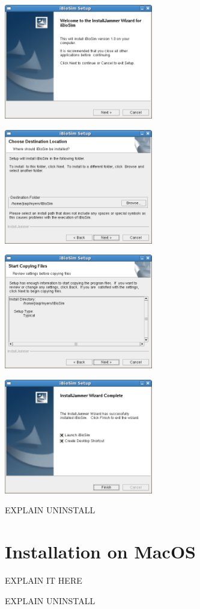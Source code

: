 \documentclass[titlepage,11pt]{article}
\begin{document}
\includegraphics[height=50mm]{screenshots/setup}

\includegraphics[height=50mm]{screenshots/location}

\includegraphics[height=50mm]{screenshots/confirm}

\includegraphics[height=50mm]{screenshots/finish}


EXPLAIN UNINSTALL

\section{Installation on MacOS}

\noindent
EXPLAIN IT HERE

EXPLAIN UNINSTALL
\end{document}
